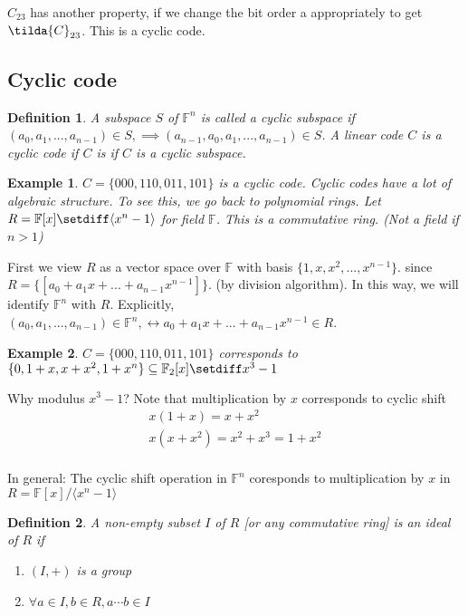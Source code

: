 \documentclass{article}
\newtheorem{defn}{Definition}
\newtheorem{eg}{Example}
\begin{document}
$C_{23}$ has another property, if we change the bit order a appropriately to get
$\tilda{C}_{23}$. This is a cyclic code.

\subsection{Cyclic code}
\begin{defn}
    A subspace $S$ of $\mathbb{F}^n$ is called a cyclic subspace if
    $(a_0, a_1, ..., a_{n-1})\in S, \implies (a_{n-1}, a_0, a_1,...,a_{n-1})\in S$.
    A linear code $C$ is a cyclic code if $C$ is if $C$ is a cyclic subspace.
\end{defn}

\begin{eg}
    $C = \{000, 110, 011, 101\}$ is a cyclic code. Cyclic codes have a lot of
    algebraic structure. To see this, we go back to polynomial rings. Let
    $R = \mathbb{F}[x]\setdiff\langle x^n-1\rangle$ for field $\mathbb{F}$. This
    is a commutative ring. (Not a field if $n > 1$)
\end{eg}

First we view $R$ as a vector space over $\mathbb{F}$ with basis
$\{1, x, x^2, ..., x^{n-1}\}$. since $R = \{[a_0 + a_1x + ... + a_{n-1}x^{n-1}]\}$.
(by division algorithm). In this way, we will identify $\mathbb{F}^n$ with $R$.
Explicitly, $(a_0, a_1, ..., a_{n-1}) \in \mathbb{F}^n, \leftrightarrow
a_0 + a_1x + ... + a_{n-1}x^{n-1} \in R$.

\begin{eg}
    $C = \{000, 110, 011, 101\}$ corresponds to
    $\{0, 1+x, x+x^2, 1+x^n\}\subseteq \mathbb{F}_2[x]\setdiff x^3-1$
\end{eg}

Why modulus $x^3 -1$? Note that multiplication by $x$ corresponds to cyclic shift
\begin{align*}
    x(1+x) = x + x^2\\
    x(x+x^2) = x^2+x^3 = 1 + x^2\\
\end{align*}

In general: The cyclic shift operation in $\mathbb{F}^n$ coresponds to
multiplication by $x$ in $R = \mathbb{F}[x]/\langle x^n-1 \rangle$

\begin{defn}
    A non-empty subset $I$ of $R$ [or any commutative ring] is an
    ideal of $R$ if
    \begin{enumerate}
        \item $(I, +)$ is a group
        \item $\forall a\in I, b\in R, a\cdots b\in I$
    \end{enumerate}
\end{defn}
\end{document}
